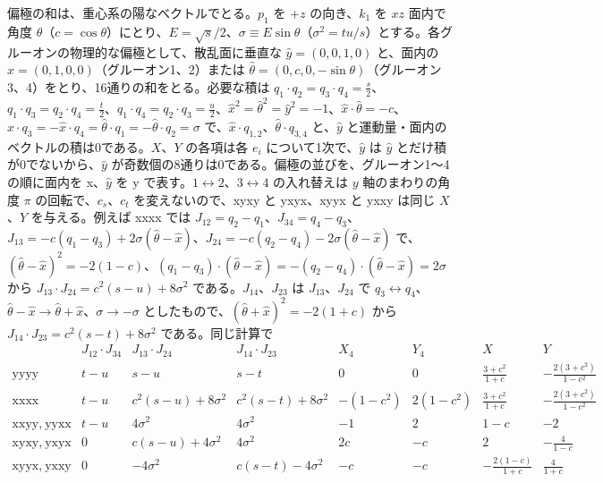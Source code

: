 \documentclass[a4paper,10pt]{ltjsarticle}
\begin{document}
偏極の和は、重心系の陽なベクトルでとる。$p_1$ を $+z$ の向き、$k_1$ を $xz$ 面内で角度 $\theta$（$c=\cos\theta$）にとり、$E=\sqrt s/2$、$\sigma\equiv E\sin\theta$（$\sigma^2=tu/s$）とする。各グルーオンの物理的な偏極として、散乱面に垂直な $\hat y=(0,0,1,0)$ と、面内の $\hat x=(0,1,0,0)$（グルーオン1、2）または $\hat\theta=(0,c,0,-\sin\theta)$（グルーオン3、4）をとり、16通りの和をとる。必要な積は $q_1\cdot q_2=q_3\cdot q_4=\frac s2$、$q_1\cdot q_3=q_2\cdot q_4=\frac t2$、$q_1\cdot q_4=q_2\cdot q_3=\frac u2$、$\hat x^2=\hat\theta^2=\hat y^2=-1$、$\hat x\cdot\hat\theta=-c$、$\hat x\cdot q_3=-\hat x\cdot q_4=\hat\theta\cdot q_1=-\hat\theta\cdot q_2=\sigma$ で、$\hat x\cdot q_{1,2}$、$\hat\theta\cdot q_{3,4}$ と、$\hat y$ と運動量・面内のベクトルの積は0である。$X$、$Y$ の各項は各 $e_i$ について1次で、$\hat y$ は $\hat y$ とだけ積が0でないから、$\hat y$ が奇数個の8通りは0である。偏極の並びを、グルーオン1〜4の順に面内を x、$\hat y$ を y で表す。$1\leftrightarrow2$、$3\leftrightarrow4$ の入れ替えは $y$ 軸のまわりの角度 $\pi$ の回転で、$c_s$、$c_t$ を変えないので、xyxy と yxyx、xyyx と yxxy は同じ $X$、$Y$ を与える。例えば xxxx では $J_{12}=q_2-q_1$、$J_{34}=q_4-q_3$、$J_{13}=-c(q_1-q_3)+2\sigma(\hat\theta-\hat x)$、$J_{24}=-c(q_2-q_4)-2\sigma(\hat\theta-\hat x)$ で、$(\hat\theta-\hat x)^2=-2(1-c)$、$(q_1-q_3)\cdot(\hat\theta-\hat x)=-(q_2-q_4)\cdot(\hat\theta-\hat x)=2\sigma$ から $J_{13}\cdot J_{24}=c^2(s-u)+8\sigma^2$ である。$J_{14}$、$J_{23}$ は $J_{13}$、$J_{24}$ で $q_3\leftrightarrow q_4$、$\hat\theta-\hat x\to\hat\theta+\hat x$、$\sigma\to-\sigma$ としたもので、$(\hat\theta+\hat x)^2=-2(1+c)$ から $J_{14}\cdot J_{23}=c^2(s-t)+8\sigma^2$ である。同じ計算で
\begin{equation*}
\renewcommand{\arraystretch}{1.5}
\begin{array}{c|ccc|cc|cc}
 & J_{12}\!\cdot\!J_{34} & J_{13}\!\cdot\!J_{24} & J_{14}\!\cdot\!J_{23} & X_4 & Y_4 & X & Y\\ \hline
\text{yyyy} & t-u & s-u & s-t & 0 & 0 & \frac{3+c^2}{1+c} & -\frac{2(3+c^2)}{1-c^2}\\
\text{xxxx} & t-u & c^2(s-u)+8\sigma^2 & c^2(s-t)+8\sigma^2 & -(1-c^2) & 2(1-c^2) & \frac{3+c^2}{1+c} & -\frac{2(3+c^2)}{1-c^2}\\
\text{xxyy},\ \text{yyxx} & t-u & 4\sigma^2 & 4\sigma^2 & -1 & 2 & 1-c & -2\\
\text{xyxy},\ \text{yxyx} & 0 & c(s-u)+4\sigma^2 & 4\sigma^2 & 2c & -c & 2 & -\frac{4}{1-c}\\
\text{xyyx},\ \text{yxxy} & 0 & -4\sigma^2 & c(s-t)-4\sigma^2 & -c & -c & -\frac{2(1-c)}{1+c} & \frac{4}{1+c}
\end{array}
\end{equation*}
\end{document}
